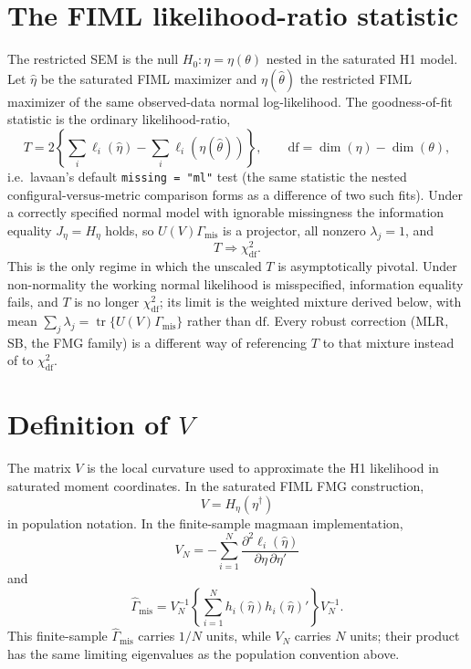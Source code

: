 \documentclass[11pt]{article}
\newcommand{\tr}{\operatorname{tr}}
\begin{document}
\section*{The FIML likelihood-ratio statistic}

The restricted SEM is the null \(H_0:\eta=\eta(\theta)\) nested in the
saturated H1 model. Let \(\hat\eta\) be the saturated FIML maximizer and
\(\eta(\hat\theta)\) the restricted FIML maximizer of the same observed-data
normal log-likelihood. The goodness-of-fit statistic is the ordinary
likelihood-ratio,
\[
  T
    =
  2\left\{
    \textstyle\sum_i \ell_i(\hat\eta)
    -
    \textstyle\sum_i \ell_i(\eta(\hat\theta))
  \right\},
  \qquad
  \mathrm{df} = \dim(\eta) - \dim(\theta),
\]
i.e.\ lavaan's default \texttt{missing = "ml"} test (the same statistic the
nested configural-versus-metric comparison forms as a difference of two such
fits). Under a correctly specified normal model with ignorable missingness the
information equality \(J_\eta = H_\eta\) holds, so
\(U(V)\Gamma_{\mathrm{mis}}\) is a projector, all nonzero \(\lambda_j=1\), and
\[
  T \Rightarrow \chi^2_{\mathrm{df}}.
\]
This is the only regime in which the unscaled \(T\) is asymptotically pivotal.
Under non-normality the working normal likelihood is misspecified, information
equality fails, and \(T\) is no longer \(\chi^2_{\mathrm{df}}\); its limit is
the weighted mixture derived below, with mean \(\sum_j\lambda_j=\tr\{U(V)
\Gamma_{\mathrm{mis}}\}\) rather than \(\mathrm{df}\). Every robust correction
(MLR, SB, the FMG family) is a different way of referencing \(T\) to that
mixture instead of to \(\chi^2_{\mathrm{df}}\).

\section*{Definition of \(V\)}

The matrix \(V\) is the local curvature used to approximate the H1 likelihood
in saturated moment coordinates. In the saturated FIML FMG construction,
\[
  V = H_\eta(\eta^\dagger)
\]
in population notation. In the finite-sample magmaan implementation,
\[
  V_N
    =
  -\sum_{i=1}^N
    \frac{\partial^2 \ell_i(\hat\eta)}
         {\partial\eta\,\partial\eta'}
\]
and
\[
  \hat\Gamma_{\mathrm{mis}}
    =
  V_N^{-1}
  \left\{
    \sum_{i=1}^N h_i(\hat\eta)h_i(\hat\eta)'
  \right\}
  V_N^{-1}.
\]
This finite-sample \(\hat\Gamma_{\mathrm{mis}}\) carries \(1/N\) units, while
\(V_N\) carries \(N\) units; their product has the same limiting eigenvalues
as the population convention above.
\end{document}
